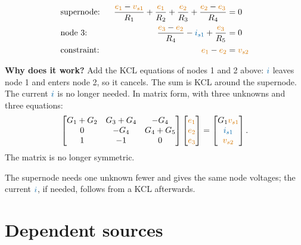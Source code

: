 \documentclass[11pt,a4paper]{article}
\newcommand{\Icol}[1]{\textcolor{ccur}{#1}}
\newcommand{\Vcol}[1]{\textcolor{cvolt}{#1}}
\newcommand{\e}[1]{\textcolor{cvolt}{e_{#1}}}
\newcommand{\nodev}[3]{\fill (#1) circle (1.7pt) node[#2, inner sep=2pt, font=\small, text=cvolt] {#3};}
\newcommand{\gnd}[1]{\draw (#1,0) -- (#1,-0.2) node[ground] {};}
\newcommand{\exB}[1]{%
  \draw (0,0) to[american voltage source, invert, l=$\Vcol{v_{s1}}$] (0,2);
  \draw (0,2) to[R, l=$R_1$] (1.8,2) to[american voltage source, l=$\Vcol{v_{s2}}$] (3.6,2)
        to[R, l=$R_4$] (5.4,2) -- (7.0,2);
  \draw (1.8,2) to[R, l=$R_2$] (1.8,0);
  \draw (3.6,2) to[R, l=$R_3$] (3.6,0);
  \draw (5.4,0) to[american current source, l_=$\Icol{i_{s1}}$] (5.4,2);
  \draw (7.0,2) to[R, l=$R_5$] (7.0,0);
  \draw (0,0) -- (7.0,0);
  \nodev{1.8,2}{above right}{$e_1$}
  \nodev{3.6,2}{above left}{$e_2$}
  \nodev{5.4,2}{above}{$e_3$}
  \ifnum#1=1
    \draw[iar] (2.55,1.5) -- (3.05,1.5);
    \node[font=\small, text=ccur] at (2.8,1.25) {$i$};
  \fi
  \ifnum#1=2
    \draw[dashed, metured, thick, rounded corners=4pt] (1.5,1.6) rectangle (3.9,2.95);
    \node[font=\scriptsize, text=metured, anchor=south] at (2.7,2.95) {supernode};
  \fi
  \gnd{1.8}}
\begin{document}
\begin{examplebox}
\begin{minipage}[c]{0.44\linewidth}
\centering
{}
\end{minipage}\hfill
\begin{minipage}[c]{0.54\linewidth}
\small
\begin{alignat*}{2}
  &\text{supernode:}\ \ & \frac{\e{1} - \Vcol{v_{s1}}}{R_1} + \frac{\e{1}}{R_2} + \frac{\e{2}}{R_3}
                       + \frac{\e{2} - \e{3}}{R_4} &= 0\\
  &\text{node 3:}\ \ & \frac{\e{3} - \e{2}}{R_4} - \Icol{i_{s1}} + \frac{\e{3}}{R_5} &= 0\\
  &\text{constraint:}\ \ & \e{1} - \e{2} &= \Vcol{v_{s2}}
\end{alignat*}
\end{minipage}
\end{examplebox}

\textbf{Why does it work?} Add the KCL equations of nodes 1 and 2 above: $\Icol{i}$
leaves node 1 and enters node 2, so it cancels. The sum is KCL around the supernode.
The current $\Icol{i}$ is no longer needed. In matrix form, with three unknowns and three equations:
\[
  \begin{bmatrix}
    G_1 + G_2 & G_3 + G_4 & -G_4\\
    0 & -G_4 & G_4 + G_5\\
    1 & -1 & 0
  \end{bmatrix}
  \begin{bmatrix} \e{1}\\ \e{2}\\ \e{3} \end{bmatrix}
  =
  \begin{bmatrix} G_1\Vcol{v_{s1}}\\ \Icol{i_{s1}}\\ \Vcol{v_{s2}} \end{bmatrix} .
\]
The matrix is no longer symmetric.

The supernode needs one unknown fewer and gives the same node voltages; the current
$\Icol{i}$, if needed, follows from a KCL afterwards.

\section{Dependent sources}
\end{document}
